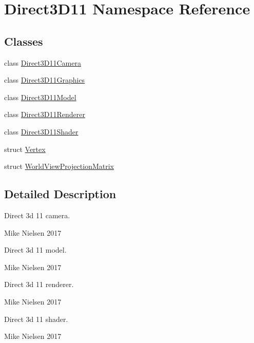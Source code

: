 \hypertarget{namespace_direct3_d11}{}\section{Direct3\+D11 Namespace Reference}
\label{namespace_direct3_d11}
\subsection*{Classes}
\begin{DoxyCompactItemize}
\item 
class \mbox{\hyperlink{class_direct3_d11_1_1_direct3_d11_camera}{Direct3\+D11\+Camera}}
\item 
class \mbox{\hyperlink{class_direct3_d11_1_1_direct3_d11_graphics}{Direct3\+D11\+Graphics}}
\item 
class \mbox{\hyperlink{class_direct3_d11_1_1_direct3_d11_model}{Direct3\+D11\+Model}}
\item 
class \mbox{\hyperlink{class_direct3_d11_1_1_direct3_d11_renderer}{Direct3\+D11\+Renderer}}
\item 
class \mbox{\hyperlink{class_direct3_d11_1_1_direct3_d11_shader}{Direct3\+D11\+Shader}}
\item 
struct \mbox{\hyperlink{struct_direct3_d11_1_1_vertex}{Vertex}}
\item 
struct \mbox{\hyperlink{struct_direct3_d11_1_1_world_view_projection_matrix}{World\+View\+Projection\+Matrix}}
\end{DoxyCompactItemize}


\subsection{Detailed Description}
Direct 3d 11 camera.

Mike Nielsen 2017

Direct 3d 11 model.

Mike Nielsen 2017

Direct 3d 11 renderer.

Mike Nielsen 2017

Direct 3d 11 shader.

Mike Nielsen 2017 